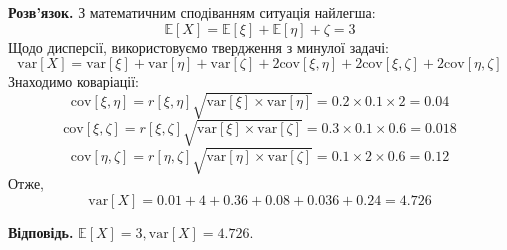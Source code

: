 \documentclass[14pt]{extarticle}
\begin{document}
\textbf{Розв'язок.} З математичним сподіванням ситуація найлегша:
\[
\mathbb{E}[X] = \mathbb{E}[\xi]+\mathbb{E}[\eta]+\mathbb{\zeta} = 3
\]
Щодо дисперсії, використовуємо твердження з минулої задачі:
\[
\text{var}[X] = \text{var}[\xi] + \text{var}[\eta] + \text{var}[\zeta] + 2 \text{cov}[\xi,\eta] + 2\text{cov}[\xi,\zeta]+2\text{cov}[\eta,\zeta]
\]
Знаходимо коваріації:
\[
\text{cov}[\xi,\eta] = r[\xi,\eta]\sqrt{\text{var}[\xi]\times\text{var}[\eta]} = 0.2 \times 0.1 \times 2 = 0.04
\]
\[
\text{cov}[\xi,\zeta] = r[\xi,\zeta]\sqrt{\text{var}[\xi]\times\text{var}[\zeta]} = 0.3 \times 0.1 \times 0.6 = 0.018
\]
\[
\text{cov}[\eta,\zeta] = r[\eta,\zeta]\sqrt{\text{var}[\eta] \times \text{var}[\zeta]} = 0.1 \times 2 \times 0.6 = 0.12
\]
Отже,
\[
\text{var}[X] = 0.01 + 4 + 0.36 + 0.08 + 0.036 + 0.24 = 4.726
\]

\textbf{Відповідь.} $\mathbb{E}[X]=3,\text{var}[X] = 4.726$.
\end{document}
